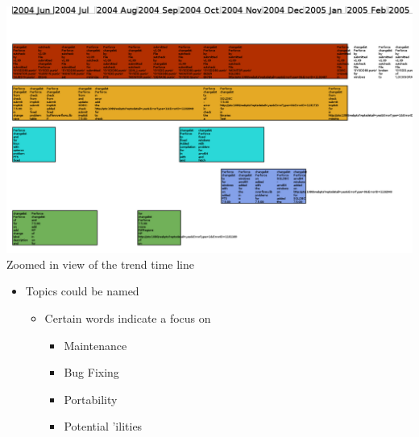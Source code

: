 \documentclass[titlepage,usenames,a4,landscape,semhelv]{seminar}
\begin{document}
\begin{slide}
\begin{itemize}
\begin{itemize}







\newslide


\newslide

\begin{specquoteh}
\begin{center}
\includegraphics[width=1.25\textwidth]{class-smear-plot-crop-scaled-zoomed} \\
Zoomed in view of the trend time line
\end{center}
\end{specquoteh}




\end{itemize}
\end{itemize}
\begin{itemize}
\item Topics could be named
	\begin{itemize}
	\item Certain words indicate a focus on
		\begin{itemize}
		\item Maintenance
		\item Bug Fixing
		\item Portability
		\item Potential 'ilities


\end{itemize}
\end{itemize}
\end{itemize}
\end{slide}
\end{document}
